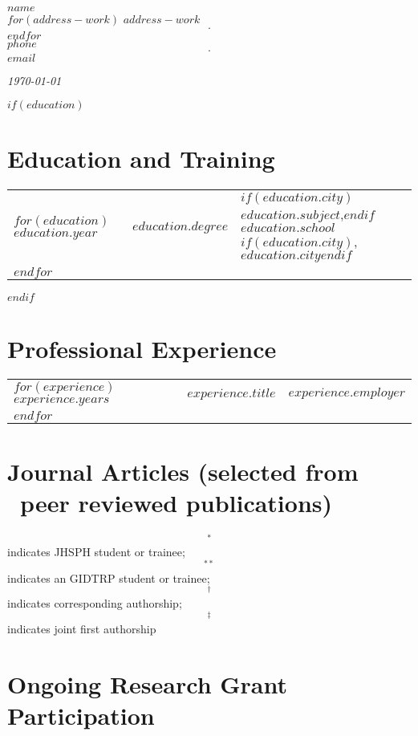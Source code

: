 \documentclass[martgin, line, 10pt]{article}
\begin{document}
\begin{multicols}{2}
  \textbf{$name$}\\
  $for(address-work)$
  $address-work$ $$\cdot$$
  $endfor$\\
  $phone$ $$\cdot$$
  \href{mailto:$email$}{$email$}
  \columnbreak

  \begin{flushright}
    \textit{\today}
  \end{flushright}
\end{multicols}


$if(education)$
\section*{Education and Training}
\noindent
\begin{tabular}{lll}
$for(education)$
$education.year$&$education.degree$&
$if(education.city)$$education.subject$,$endif$
$education.school$$if(education.city)$, $education.city$$endif$\\
$endfor$
\end{tabular}
$endif$

\section*{Professional Experience}
\noindent
\begin{longtable}[l]{lll}
$for(experience)$
$experience.years$&
$experience.title$&
$experience.employer$\\
$endfor$
\end{longtable}


\section*{Journal Articles (selected from \npeer\ peer reviewed publications)}

\begin{footnotesize}$$^*$$ indicates JHSPH student or trainee;
    $$^{**}$$ indicates an GIDTRP student or trainee;
    $$^\dagger$$ indicates corresponding authorship;
    $$^\ddagger$$ indicates joint first authorship
  \end{footnotesize}



\begin{enumerate}[noitemsep]
  
\end{enumerate}


\section*{Ongoing Research Grant Participation}
\end{document}
